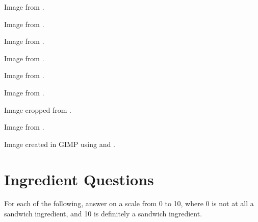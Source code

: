 	\begin{minipage}{\textwidth}
		Image from \cite{pizzaSandwich}.
	\end{minipage}

	\begin{minipage}{\textwidth}
		Image from \cite{toastSandwich}.
	\end{minipage}

	\begin{minipage}{\textwidth}
		Image from \cite{oreo}.
	\end{minipage}

	\begin{minipage}{\textwidth}
		Image from \cite{ritzCracker}.
	\end{minipage}

	\begin{minipage}{\textwidth}
		Image from \cite{sushiBurrito}.
	\end{minipage}

	\begin{minipage}{\textwidth}
		Image from \cite{nigiri}.
	\end{minipage}

	\begin{minipage}{\textwidth}
		Image cropped from \cite{cheese}.
	\end{minipage}

	\begin{minipage}{\textwidth}
		Image from \cite{salad}.
	\end{minipage}

	\begin{minipage}{\textwidth}
		Image created in GIMP using \cite{breadSlices} and \cite{brick}.
	\end{minipage}

\clearpage
\section{Ingredient Questions}
	For each of the following, answer on a scale from 0 to 10, where 0 is not at all a sandwich ingredient, and 10 is definitely a sandwich ingredient.

